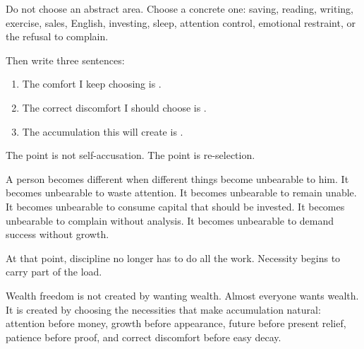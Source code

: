 Do not choose an abstract area. Choose a concrete one: saving, reading, writing, exercise, sales, English, investing, sleep, attention control, emotional restraint, or the refusal to complain.

Then write three sentences:

\begin{enumerate}
\item The comfort I keep choosing is \underline{\hspace{2.8cm}}.
\item The correct discomfort I should choose is \underline{\hspace{2.8cm}}.
\item The accumulation this will create is \underline{\hspace{2.8cm}}.
\end{enumerate}

The point is not self-accusation. The point is re-selection.

A person becomes different when different things become unbearable to him. It becomes unbearable to waste attention. It becomes unbearable to remain unable. It becomes unbearable to consume capital that should be invested. It becomes unbearable to complain without analysis. It becomes unbearable to demand success without growth.

At that point, discipline no longer has to do all the work. Necessity begins to carry part of the load.

Wealth freedom is not created by wanting wealth. Almost everyone wants wealth. It is created by choosing the necessities that make accumulation natural: attention before money, growth before appearance, future before present relief, patience before proof, and correct discomfort before easy decay.
